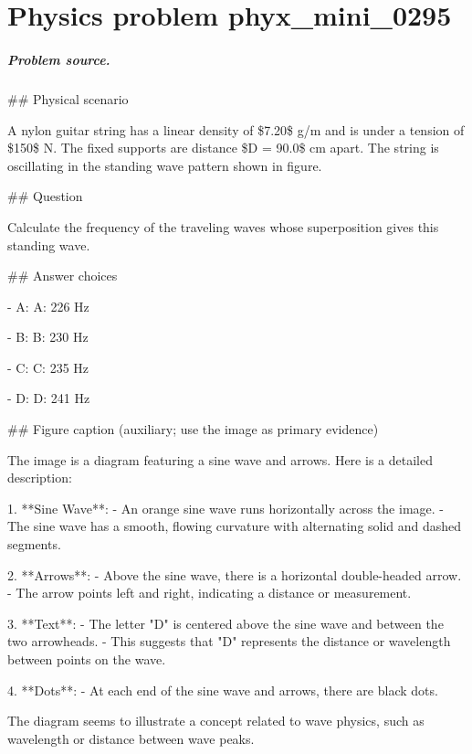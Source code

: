 
\chapter{Physics problem phyx\_mini\_0295}
\label{ch:PhyXMiniProblems_problem_phyx_mini_0295}

\paragraph{Problem source.}
\#\# Physical scenario

A nylon guitar string has a linear density of \$7.20\$ g/m and is under a tension of \$150\$ N. The fixed supports are distance \$D = 90.0\$ cm apart. The string is oscillating in the standing wave pattern shown in figure.

\#\# Question

Calculate the frequency of the traveling waves whose superposition gives this standing wave.

\#\# Answer choices

- A: A: 226 Hz

- B: B: 230 Hz

- C: C: 235 Hz

- D: D: 241 Hz

\#\# Figure caption (auxiliary; use the image as primary evidence)

The image is a diagram featuring a sine wave and arrows. Here is a detailed description:

1. **Sine Wave**: 
   - An orange sine wave runs horizontally across the image.
   - The sine wave has a smooth, flowing curvature with alternating solid and dashed segments.

2. **Arrows**:
   - Above the sine wave, there is a horizontal double-headed arrow.
   - The arrow points left and right, indicating a distance or measurement.

3. **Text**:
   - The letter "D" is centered above the sine wave and between the two arrowheads. 
   - This suggests that "D" represents the distance or wavelength between points on the wave.

4. **Dots**:
   - At each end of the sine wave and arrows, there are black dots.

The diagram seems to illustrate a concept related to wave physics, such as wavelength or distance between wave peaks.

